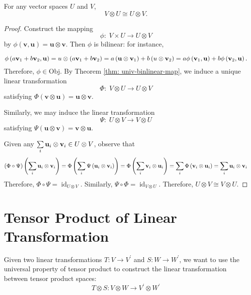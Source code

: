 \begin{theorem}
For any vector spaces \(U\) and \(V\),
\[
V \otimes  U \cong  U \otimes  V.
\]
\end{theorem}

\begin{proof}
Construct the mapping
\[
\phi  : \;V \times  U \rightarrow  U \otimes  V
\]
by \(\phi \left( {\mathbf{v},\mathbf{u}}\right)  = \mathbf{u} \otimes  \mathbf{v}
\). Then \(\phi\) is bilinear: for instance,

\[
\phi \left( {a{\bf v}_1 + b{\bf v}_2,\mathbf{u}}\right)  = u \otimes  \left( {a{\bf v}_1 + b{\bf v}_2}\right)
= a\left( {\mathbf{u} \otimes  {\bf v}_1}\right)  + b\left( {u \otimes  {\bf v}_2}\right)
= {a\phi }\left( {{\bf v}_1,\mathbf{u}}\right)  + {b\phi }\left( {{\bf v}_2,\mathbf{u}}\right).
\]
Therefore, \(\phi  \in  \mathrm{{Obj}}\). By Theorem \autoref{thm: univ-binlinear-map}, we induce a unique linear transformation
\[
\Phi  : \;V \otimes  U \rightarrow  U \otimes  V
\]
satisfying \(\Phi \left( {\mathbf{v} \otimes  \mathbf{u}}\right)  = \mathbf{u} \otimes  \mathbf{v}
\).

Similarly, we may induce the linear transformation
\[
\Psi  : \;U \otimes  V \rightarrow  V \otimes  U
\]
satisfying \(\Psi \left( {\mathbf{u} \otimes  \mathbf{v}}\right)  = \mathbf{v} \otimes  \mathbf{u}\).

Given any \(\mathop{\sum }\limits_{i}{\mathbf{u}}_{i} \otimes  {\bf v}_{i} \in  U \otimes  V\), observe that
\[
\left( {\Phi  \circ  \Psi }\right) \left( {\mathop{\sum }\limits_{i}{\mathbf{u}}_{i} \otimes  {\bf v}_{i}}\right)  = \Phi \left( {\mathop{\sum }\limits_{i}\Psi \left( {{\mathbf{u}}_{i} \otimes  {\bf v}_{i}}\right) }\right)
= \Phi \left( {\mathop{\sum }\limits_{i}{\bf v}_{i} \otimes  {\mathbf{u}}_{i}}\right)
= \mathop{\sum }\limits_{i}\Phi \left( {{\bf v}_{i} \otimes  {\mathbf{u}}_{i}}\right)
= \mathop{\sum }\limits_{i}{\mathbf{u}}_{i} \otimes  {\bf v}_{i}
\]
Therefore, \(\Phi  \circ  \Psi  = {\operatorname{id}}_{U \otimes  V}\). Similarly, \(\Psi  \circ  \Phi  = {\operatorname{id}}_{V \otimes  U}\). Therefore,
$U \otimes  V \cong  V \otimes  U$.
\end{proof} 

\section{Tensor Product of Linear Transformation}
 Given two linear transformations \(T : V \rightarrow  {V}^{\prime }\) and \(S : W \rightarrow  {W}^{\prime }\), we want to use the universal property of tensor product to construct the linear transformation between tensor product spaces:
\[
T \otimes  S : V \otimes  W \rightarrow  {V}^{\prime } \otimes  {W}^{\prime }
\]

